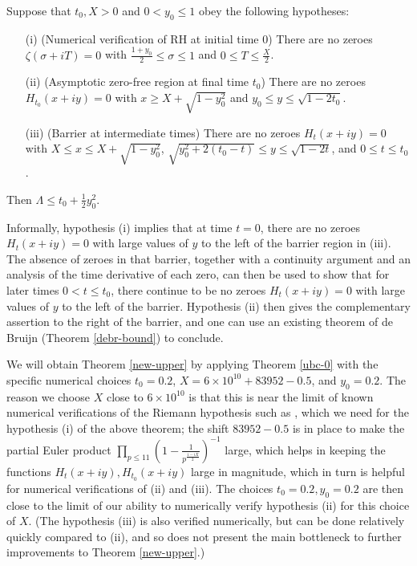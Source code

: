 \begin{theorem}\label{ubc-0}  Suppose that $t_0, X > 0$ and $0 < y_0 \leq 1$ obey the following hypotheses:
\begin{itemize}
\item[(i)]  (Numerical verification of RH at initial time $0$) There are no zeroes $\zeta(\sigma+iT) = 0$ with $\frac{1+y_0}{2} \leq \sigma \leq 1$ and $0 \leq T \leq \frac{X}{2}$.
\item[(ii)]  (Asymptotic zero-free region at final time $t_0$) There are no zeroes $H_{t_0}(x+iy)=0$ with $x \geq X+\sqrt{1-y_0^2}$ and $y_0 \leq y \leq \sqrt{1-2t_0}$.
\item[(iii)]  (Barrier at intermediate times) There are no zeroes $H_{t}(x+iy)=0$ with $X \leq x \leq X+\sqrt{1-y_0^2}$, $\sqrt{y_0^2+2(t_0-t)} \leq y \leq \sqrt{1-2t}$, and $0 \leq t \leq t_0$.
\end{itemize}
Then $\Lambda \leq t_0 + \frac{1}{2} y_0^2$.
\end{theorem}

Informally, hypothesis (i) implies that at time $t=0$, there are no zeroes $H_t(x+iy)=0$ with large values of $y$ to the left of the barrier region in (iii).  The absence of zeroes in that barrier, together with a continuity argument and an analysis of the time derivative of each zero, can then be used to show that for later times $0 < t \leq t_0$, there continue to be no zeroes $H_t(x+iy)=0$ with large values of $y$ to the left of the barrier.  Hypothesis (ii) then gives the complementary assertion to the right of the barrier, and one can use an existing theorem of de Bruijn (Theorem \ref{debr-bound}) to conclude.

We will obtain Theorem \ref{new-upper} by applying Theorem \ref{ubc-0} with the specific numerical choices $t_0 = 0.2$, $X = 6 \times 10^{10} + 83952 - 0.5$, and $y_0 = 0.2$.  The reason we choose $X$ close to $6 \times 10^{10}$ is that this is near the limit of known numerical verifications of the Riemann hypothesis such as \cite{platt}, which we need for the hypothesis (i) of the above theorem; the shift $83952 - 0.5$ is in place to make the partial Euler product $\prod_{p \leq 11} (1 - \frac{1}{p^{\frac{1-iX}{2}}})^{-1}$ large, which helps in keeping the functions $H_t(x+iy), H_{t_0}(x+iy)$ large in magnitude, which in turn is helpful for numerical verifications of (ii) and (iii).  The choices $t_0=0.2, y_0=0.2$ are then close to the limit of our ability to numerically verify hypothesis (ii) for this choice of $X$.  (The hypothesis (iii) is also verified numerically, but can be done relatively quickly compared to (ii), and so does not present the main bottleneck to further improvements to Theorem \ref{new-upper}.)

